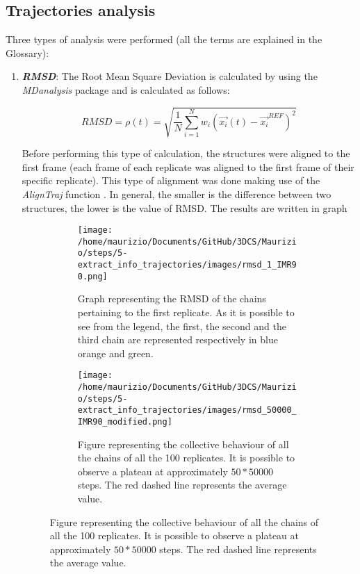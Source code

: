 \subsection{Trajectories analysis} \label{chap: trajectory analysis}

Three types of analysis were performed (all the terms are explained in the Glossary): %

\begin{enumerate}
    \item \textbf{\textit{RMSD}}: The Root Mean Square Deviation is calculated by using the \textit{MDanalysis} package
    \cite{gowersMDAnalysisPythonPackage2016}
    and is calculated as follows:

    \begin{equation} \label{eq: RMSD}
        RMSD = \rho(t) = \sqrt{\frac{1}{N} \sum_{i=1}^N{w_i \left(\vec{x_i}(t) - \vec{x_i}^{REF}\right)^2}}
    \end{equation}

    Before performing this type of calculation, the structures were aligned to the first frame (each frame of each replicate was aligned to the first frame of their specific replicate). This type of alignment was done making use of the \textit{AlignTraj} function
    \cite{gowersMDAnalysisPythonPackage2016}
    . In general, the smaller is the difference between two structures, the lower is the value of RMSD. The results are written in graph
    
    \begin{figure}
        \centering
        
        \begin{subfigure}{0.49\textwidth}
          \texttt{[image: /home/maurizio/Documents/GitHub/3DCS/Maurizio/steps/5-extract\_info\_trajectories/images/rmsd\_1\_IMR90.png]}
          \caption{Graph representing the RMSD of the chains pertaining to the first replicate. As it is possible to see from the legend, the first, the second and the third chain are represented respectively in blue orange and green.}
          \label{fig:RMSD first replicate}
        \end{subfigure}
        \hfill
        \begin{subfigure}{0.49\textwidth}
          \texttt{[image: /home/maurizio/Documents/GitHub/3DCS/Maurizio/steps/5-extract\_info\_trajectories/images/rmsd\_50000\_IMR90\_modified.png]}
          \caption{Figure representing the collective behaviour of all the chains of all the 100 replicates. It is possible to observe a plateau at approximately $50*50000$ steps. The red dashed line represents the average value.}
          \label{fig:RMSD collective replicates}
        \end{subfigure}
      

\end{figure}
\end{enumerate}
